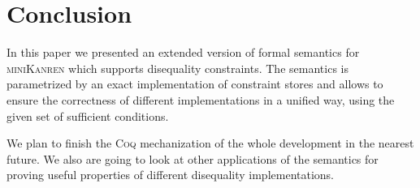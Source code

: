 \section{Conclusion}

In this paper we presented an extended version of formal semantics for \textsc{miniKanren} which supports disequality constraints.
The semantics is parametrized by an exact implementation of constraint stores and allows to ensure the correctness of different implementations
in a unified way, using the given set of sufficient conditions.

We plan to finish the \textsc{Coq} mechanization of the whole development in the nearest future. We also are going to look at other applications
of the semantics for proving useful properties of different disequality implementations.
